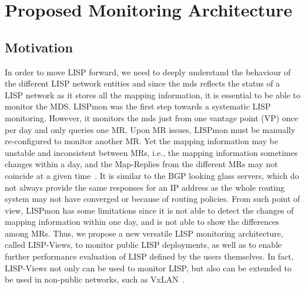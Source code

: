 \section{Proposed Monitoring Architecture}
\label{sec:lispviews_archi}

\subsection{Motivation}
\label{sec:lispviews_archi_motivation}

In order to move LISP forward, we need to deeply understand the behaviour of the different LISP network entities and since the \acrshort{mds} reflects the status of a LISP network as it stores all the mapping information, it is essential to be able to monitor the MDS. LISPmon was the first step towards a systematic LISP monitoring.  However, it monitors the \acrshort{mds} just from one vantage point (VP) once per day and only queries one MR.  Upon MR issues, LISPmon must be manually re-configured to  monitor another MR.  Yet the mapping information may be unstable and inconsistent between MRs, i.e., the mapping information sometimes changes within a day, and the Map-Replies from the different MRs may not coincide at a given time~\cite{yue2016stability}. It is similar to the BGP looking glass servers, which do not always provide the same responses for an IP address as the whole routing system may not have converged or because of routing policies. From such point of view, LISPmon has some limitations since it is not able to detect the changes of mapping information within one day, and is not able to show the differences among MRs. Thus, we propose a new versatile LISP monitoring architecture, called LISP-Views, to monitor public LISP deployments, as well as to enable further performance evaluation of LISP defined by the users themselves. In fact, LISP-Views not only can be used to monitor LISP, but also can be extended to be used in non-public networks, such as VxLAN~\cite{mahalingam2014virtual}.

